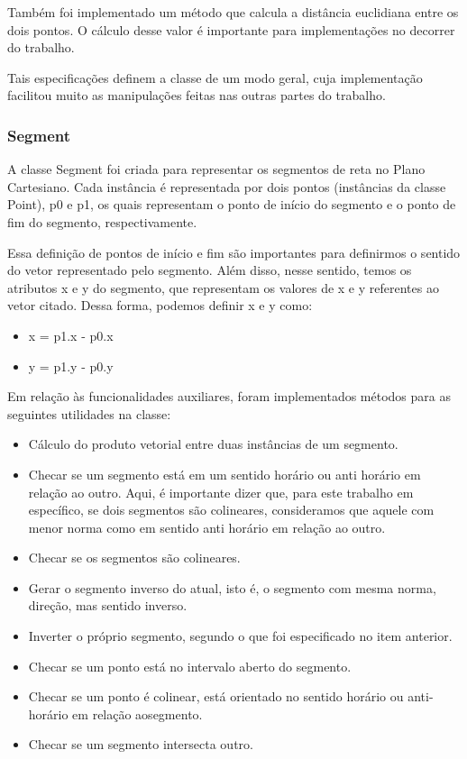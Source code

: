 \documentclass{article}
\begin{document}
Também foi implementado um método que calcula a distância euclidiana entre os dois pontos. O cálculo desse valor é importante para implementações no decorrer do trabalho.

Tais especificações definem a classe de um modo geral, cuja implementação facilitou muito as manipulações feitas nas outras partes do trabalho.

\subsubsection{Segment}

A classe Segment foi criada para representar os segmentos de reta no Plano Cartesiano. Cada instância é representada por dois pontos (instâncias da classe Point), p0 e p1, os quais representam o ponto de início do segmento e o ponto de fim do segmento, respectivamente. 

Essa definição de pontos de início e fim são importantes para definirmos o sentido do vetor representado pelo segmento. Além disso, nesse sentido, temos os atributos x e y do segmento, que representam os valores de x e y referentes ao vetor citado. Dessa forma, podemos definir x e y como:

\begin{itemize}
    \item x = p1.x - p0.x
    \item y = p1.y - p0.y
\end{itemize}
	
Em relação às funcionalidades auxiliares, foram implementados métodos para as seguintes utilidades na classe:

\begin{itemize}
    \item Cálculo do produto vetorial entre duas instâncias de um segmento.
    \item Checar se um segmento está em um sentido horário ou anti horário em relação ao outro. Aqui, é importante dizer que, para este trabalho em específico, se dois segmentos são colineares, consideramos que aquele com menor norma como em sentido anti horário em relação ao outro.
    \item Checar se os segmentos são colineares.
    \item Gerar o segmento inverso do atual, isto é, o segmento com mesma norma, direção, mas sentido inverso.
    \item Inverter o próprio segmento, segundo o que foi especificado no item anterior.
    \item Checar se um ponto está no intervalo aberto do segmento.
    \item Checar se um ponto é colinear, está orientado no sentido horário ou anti-horário em relação aosegmento.
    \item Checar se um segmento intersecta outro.
\end{itemize}
\end{document}
